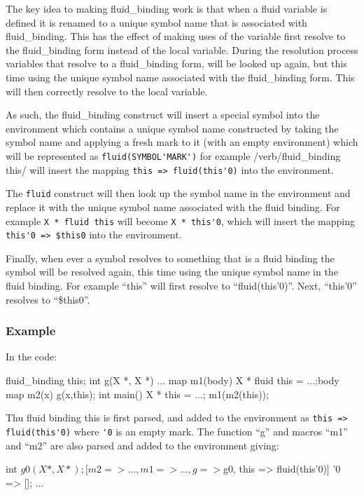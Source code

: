 \documentclass[12pt,english,letterpaper]{article}
\begin{document}
The key idea to making fluid\_binding work is that when a fluid
variable is defined it is renamed to a unique symbol name that is
associated with fluid\_binding.  This has the effect of making uses of
the variable first resolve to the fluid\_binding form instead of the
local variable.  During the resolution process variables that resolve
to a fluid\_binding form, will be looked up again, but this time using
the unique symbol name associated with the fluid\_binding form.  This
will then correctly resolve to the local variable.

As such, the fluid\_binding construct will insert a special symbol into
the environment which contains a unique symbol name constructed by
taking the symbol name and applying a fresh mark to it (with an empty
environment) which will be represented as \verb/fluid(SYMBOL'MARK')/
for example /verb/fluid\_binding this/ will insert the mapping
\verb/this => fluid(this'0)/ into the environment.

The \verb/fluid/ construct will then look up the symbol name in the
environment and replace it with the unique symbol name associated with
the fluid binding.  For example \verb/X * fluid this/ will become
\verb/X * this'0/, which will insert the mapping
\verb/this'0 => $this0/ into the environment.

Finally, when ever a symbol resolves to something that is a fluid
binding the symbol will be resolved again, this time using the unique
symbol name in the fluid binding.  For example ``this'' will first
resolve to ``fluid(this'0)''.  Next, ``this'0'' resolves to
``\$this0''.

\subsubsection{Example}

In the code:

\begin{code}
fluid_binding this;
int g(X *, X *) {...}
map m1(body) {{X * fluid this = ...;body}}
map m2(x) {g(x,this);}
int main() {
  X * this = ...;
  m1(m2(this));
}
\end{code}

Thu fluid binding this is first parsed, and added to the environment
as \verb/this => fluid(this'0)/ where \verb/'0/ is an empty mark.  The
function ``g'' and macros ``m1'' and ``m2'' are also parsed and added
to the environment giving:

\begin{code}
int $g0(X *, X *);
[m2 => ..., m1 => ..., g => $g0, this => fluid(this'0)]
'0 => [];
...
\end{code}
\end{document}
